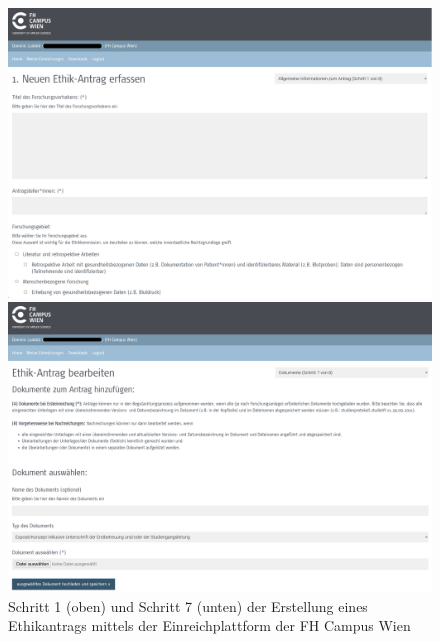 \documentclass[a4paper,12pt,twoside,numbers=noendperiod]{scrreprt}
\begin{document}
\begin{figure}[htp]
    \centering
    \begin{minipage}[t]{.97\linewidth}
        \includegraphics[width=\linewidth]{thesis/images/Luidold_Einreichplattform-Formular-Schritt-1.png}
    \end{minipage}
    \begin{minipage}[b]{.97\linewidth}
        \includegraphics[width=\linewidth]{thesis/images/Luidold_Einreichplattform-Formular-Schritt-2.png}
    \end{minipage}
    \caption[Schritt 1 und Schritt 7 der Erstellung eines Ethikantrags mittels der Einreichplattform der FH Campus Wien]{Schritt 1 (oben) und Schritt 7 (unten) der Erstellung eines Ethikantrags mittels der Einreichplattform der FH Campus Wien \cite{ethikkommission_fh_campus_wien_fh_2023}}
    \label{fig:einreichplattform-fhcw-schritt-1-7}
\end{figure}
\end{document}

